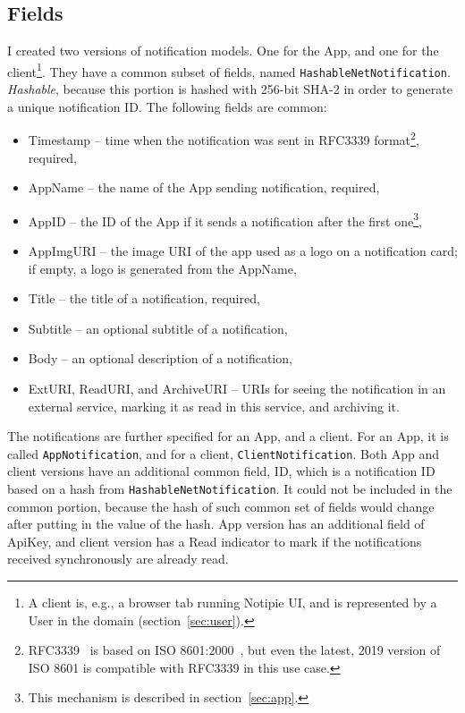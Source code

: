 \subsection{Fields}\label{sec:protocol-fields}

I created two versions of notification models.
One for the App,
and one for the client\footnote{
  A client is, e.g.,
  a browser tab running Notipie UI,
  and is represented
  by a User in the domain (section~\ref{sec:user}).
}.
They have a common subset of fields,
named \texttt{HashableNetNotification}.
\textit{Hashable},
because this portion is hashed with 256-bit SHA-2
in order to generate a unique notification ID.
The following fields are common:

\begin{itemize}
  \item Timestamp -- time when the notification was sent
        in RFC3339 format\footnote{
          RFC3339~\cite{clyne_rfc3339_2002} is based on
          ISO 8601:2000~\cite{international_organization_for_standardization_iso_2000},
          but even the latest, 2019 version of ISO 8601
          is compatible with RFC3339 in this use case.
        }, required,
  \item AppName -- the name of the App sending notification, required,
  \item AppID -- the ID of the App
        if it sends a notification after the first one\footnote{
          This mechanism is described in section~\ref{sec:app}.
        },
  \item AppImgURI -- the image URI of the app
        used as a logo on a notification card;
        if empty, a logo is generated from the AppName,
  \item Title -- the title of a notification, required,
  \item Subtitle -- an optional subtitle of a notification,
  \item Body -- an optional description of a notification,
  \item ExtURI, ReadURI, and ArchiveURI -- URIs
        for seeing the notification in an external service,
        marking it as read in this service, and archiving it.
\end{itemize}

The notifications are further specified
for an App, and a client.
For an App, it is called \texttt{AppNotification},
and for a client, \texttt{ClientNotification}.
Both App and client versions
have an additional common field, ID,
which is a notification ID
based on a hash from \texttt{HashableNetNotification}.
It could not be included in the common portion,
because the hash of such common set of fields
would change after putting in the value of the hash.
App version has an additional field of ApiKey,
and client version has a Read indicator
to mark if the notifications received
synchronously are already read.
